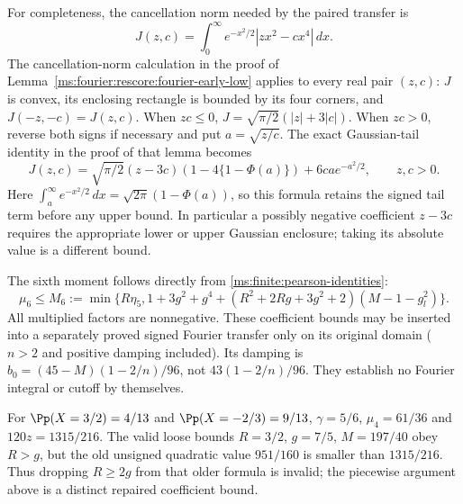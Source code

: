 For completeness, the cancellation norm needed by the paired transfer is
\[
 J(z,c)=\int_0^\infty e^{-x^2/2}|zx^2-cx^4|\,dx.
\]
The cancellation-norm calculation in the proof of
Lemma~\ref{ms:fourier:rescore:fourier-early-low} applies to every real
pair $(z,c)$: $J$ is convex, its enclosing rectangle is bounded by its
four corners, and $J(-z,-c)=J(z,c)$. When $zc\le0$,
$J=\sqrt{\pi/2}(|z|+3|c|)$. When $zc>0$, reverse both signs
if necessary and put $a=\sqrt{z/c}$. The exact Gaussian-tail identity
in the proof of that lemma becomes
\begin{equation}
 J(z,c)=\sqrt{\pi/2}(z-3c)(1-4\{1-\Phi(a)\})
          +6ca e^{-a^2/2},\qquad z,c>0.
 \label{ms:finite:paired-mills}
\end{equation}
Here $\int_a^\infty e^{-x^2/2}\,dx=\sqrt{2\pi}(1-\Phi(a))$,
so this formula retains the signed tail term before any upper bound.
In particular a possibly negative coefficient $z-3c$ requires the
appropriate lower or upper Gaussian enclosure; taking its absolute value
is a different bound.

The sixth moment follows directly from \eqref{ms:finite:pearson-identities}:
\[
 \mu_6\le M_6:=\min\{R\eta_5,
 1+3g^2+g^4+(R^2+2Rg+3g^2+2)(M-1-g_l^2)\}.
\]
All multiplied factors are nonnegative. These coefficient bounds may be
inserted into a separately proved signed Fourier transfer only on its
original domain ($n>2$ and positive damping included). Its damping is
$b_0=(45-M)(1-2/n)/96$, not $43(1-2/n)/96$.
They establish no Fourier integral or cutoff by themselves.

\begin{remark}
For $\Pp(X=3/2)=4/13$ and $\Pp(X=-2/3)=9/13$,
$\gamma=5/6$, $\mu_4=61/36$ and $120z=1315/216$.
The valid loose bounds $R=3/2$, $g=7/5$, $M=197/40$ obey $R>g$,
but the old unsigned quadratic value $951/160$ is smaller than
$1315/216$. Thus dropping $R\ge2g$ from that older formula is invalid;
the piecewise argument above is a distinct repaired coefficient bound.
\end{remark}

